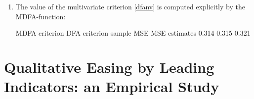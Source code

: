 \documentclass[a4paper]{book}
\begin{document}
\begin{enumerate}
\begin{Schunk}
\begin{Sinput}
> mdfa_obj_mse<-MDFA_mse(L,weight_func,Lag,Gamma)$mdfa_obj 
\end{Sinput}
\end{Schunk}
which abbreviates the lengthy list of arguments of the generic $mdfa\textunderscore analytic$-call to those required in a MSE-framework. As can be seen, estimated coefficients are identical:
\begin{Schunk}
\begin{Sinput}
> b_mat<-cbind(b_mat,mdfa_obj_mse$b)
> dimnames(b_mat)[[2]][3]<-"MDFA_mse"
> dimnames(b_mat)[[1]]<-paste("lag ",0:(L-1),sep="")
> head(as.matrix(round(b_mat,5)))
\end{Sinput}
\begin{Soutput}
         MDFA     DFA MDFA_mse
lag 0 0.53821 0.53821  0.53821
lag 1 0.10039 0.10039  0.10039
lag 2 0.17419 0.17419  0.17419
lag 3 0.11221 0.11221  0.11221
lag 4 0.08075 0.08075  0.08075
lag 5 0.01972 0.01972  0.01972
\end{Soutput}
\end{Schunk}
\item The value of the multivariate criterion \ref{dfanv} is computed explicitly by the MDFA-function:
\begin{Schunk}
\begin{Soutput}
              MDFA criterion DFA criterion sample MSE
MSE estimates          0.314         0.315      0.321
\end{Soutput}
\end{Schunk}
\end{enumerate}




\section{Qualitative Easing by Leading Indicators: an Empirical Study}\label{leading_ind}
\end{document}
